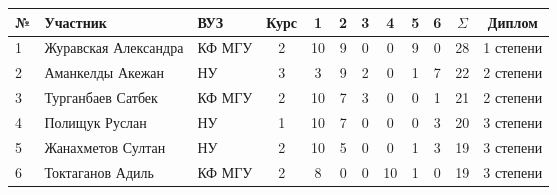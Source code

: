 \begin{center}
\begin{tabular}{|l|l|l|c|c|c|c|c|c|c|c|c|}
\hline
№ & Участник & ВУЗ & Курс & 1 & 2 & 3 & 4 & 5 & 6 & $\Sigma$ & Диплом \\
\hline
1 & Журавская Александра & КФ МГУ & 2 & 10 & 9 & 0 & 0 & 9 & 0 & 28 & 1 степени \\
\hline
2 & Аманкелды Акежан & НУ & 3 & 3 & 9 & 2 & 0 & 1 & 7 & 22 & 2 степени \\
\hline
3 & Турганбаев Сатбек & КФ МГУ & 2 & 10 & 7 & 3 & 0 & 0 & 1 & 21 & 2 степени \\
\hline
4 & Полищук Руслан & НУ & 1 & 10 & 7 & 0 & 0 & 0 & 3 & 20 & 3 степени \\
\hline
5 & Жанахметов Султан & НУ & 2 & 10 & 5 & 0 & 0 & 1 & 3 & 19 & 3 степени \\
\hline
6 & Токтаганов Адиль & КФ МГУ & 2 & 8 & 0 & 0 & 10 & 1 & 0 & 19 & 3 степени \\
\hline
\end{tabular}
\end{center}